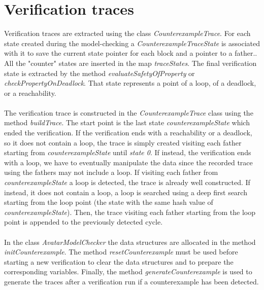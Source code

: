 \documentclass[12pt]{article}
\begin{document}
\section{Verification traces}
Verification traces are extracted using the class \textit{CounterexampleTrace}. For each state created during the model-checking a \textit{CounterexampleTraceState} is associated with it to save the current state pointer for each block and a pointer to a father.. All the "counter" states are inserted in the map \textit{traceStates}. The final verification state is extracted by the method \textit{evaluateSafetyOfProperty} or \textit{checkPropertyOnDeadlock}. That state represents a point of a loop, of a deadlock, or a reachability.
\\\\
The verification trace is constructed in the \textit{CounterexampleTrace} class using the method \textit{buildTrace}. The start point is the last state \textit{counterexampleState} which ended the verification. If the verification ends with a reachability or a deadlock, so it does not contain a loop, the trace is simply created visiting each father starting from \textit{counterexampleState} until \textit{state 0}. If instead, the verification ends with a loop, we have to eventually manipulate the data since the recorded trace using the fathers may not include a loop. If visiting each father from \textit{counterexampleState} a loop is detected, the trace is already well constructed. If instead, it does not contain a loop, a loop is searched using a deep first search starting from the loop point (the state with the same hash value of \textit{counterexampleState}). Then, the trace visiting each father starting from the loop point is appended to the previously detected cycle.
\\\\
In the class \textit{AvatarModelChecker} the data structures are allocated in the method \textit{initCounterexample}. The method \textit{resetCounterexample} must be used before starting a new verification to clear the data structures and to prepare the corresponding variables. Finally, the method \textit{generateCounterexample} is used to generate the traces after a verification run if a counterexample has been detected.
\end{document}

